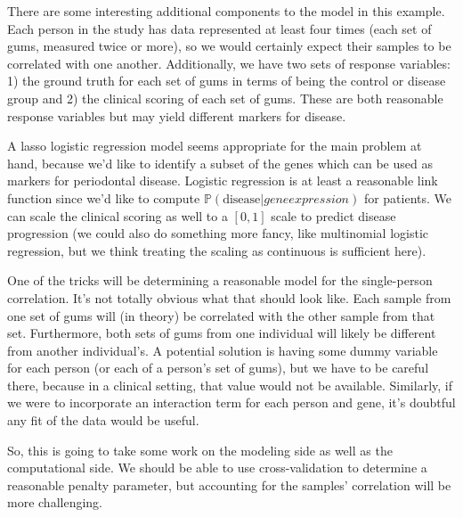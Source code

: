 \documentclass{article}
\begin{document}
There are some interesting additional components to the model in this example. Each person in the study has data represented at least four times (each set of gums, measured twice or more), so we would certainly expect their samples
to be correlated with one another. Additionally, we have two sets of response variables: 1) the ground truth for each set of gums in terms of being the control or disease group and 2) the clinical scoring of each set of gums. These are both reasonable response variables but may yield different markers for disease.

A lasso logistic regression model seems appropriate for the main problem at hand, because we'd like to identify
a subset of the genes which can be used as markers for periodontal disease. Logistic regression is at least
a reasonable link function since we'd like to compute $\mathbb{P}(\textrm{disease} | gene expression)$ for
patients. We can scale the clinical scoring as well to a $[0,1]$ scale to predict disease progression (we could
also do something more fancy, like multinomial logistic regression, but we think treating the scaling as continuous
is sufficient here).

One of the tricks will be determining a reasonable model for the single-person correlation. It's not totally
obvious what that should look like. Each sample from one set of gums will (in theory) be correlated with
the other sample from that set. Furthermore, both sets of gums from one individual will likely be different from
another individual's. A potential solution is having some dummy variable for each person (or each of a person's set of gums), but we have to be careful there, because in a clinical setting, that value would not be available. Similarly, if we were to incorporate an interaction term for each person and gene, it's doubtful any fit of the data would be useful.

So, this is going to take some work on the modeling side as well as the computational side. We should be able
to use cross-validation to determine a reasonable penalty parameter, but accounting for the samples' correlation
will be more challenging.








%
%
\end{document}
